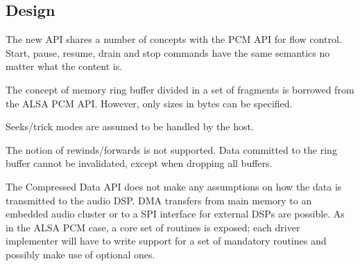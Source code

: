 \documentclass[a4paper,8pt,english]{sphinxmanual}
\begin{document}
\subsection{Design}
\label{sound/designs/compress-offload:design}
The new API shares a number of concepts with the PCM API for flow
control. Start, pause, resume, drain and stop commands have the same
semantics no matter what the content is.

The concept of memory ring buffer divided in a set of fragments is
borrowed from the ALSA PCM API. However, only sizes in bytes can be
specified.

Seeks/trick modes are assumed to be handled by the host.

The notion of rewinds/forwards is not supported. Data committed to the
ring buffer cannot be invalidated, except when dropping all buffers.

The Compressed Data API does not make any assumptions on how the data
is transmitted to the audio DSP. DMA transfers from main memory to an
embedded audio cluster or to a SPI interface for external DSPs are
possible. As in the ALSA PCM case, a core set of routines is exposed;
each driver implementer will have to write support for a set of
mandatory routines and possibly make use of optional ones.
\end{document}
